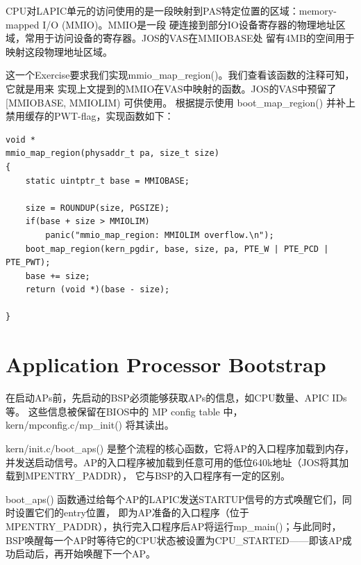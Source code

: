 \documentclass[12pt, letterpaper]{report}
\begin{document}
CPU对LAPIC单元的访问使用的是一段映射到PAS特定位置的区域：memory-mapped I/O (MMIO)。MMIO是一段
硬连接到部分IO设备寄存器的物理地址区域，常用于访问设备的寄存器。JOS的VAS在MMIOBASE处
留有4MB的空间用于映射这段物理地址区域。\par
\newpage
{}
\quad \par
这一个Exercise要求我们实现mmio\_map\_region()。我们查看该函数的注释可知，它就是用来
实现上文提到的MMIO在VAS中映射的函数。JOS的VAS中预留了 [MMIOBASE, MMIOLIM) 可供使用。
根据提示使用 boot\_map\_region() 并补上禁用缓存的PWT-flag，实现函数如下：\par 
\lstset{style=CStyle}
\setmainfont{Consolas}
\begin{lstlisting}
void *
mmio_map_region(physaddr_t pa, size_t size)
{
    static uintptr_t base = MMIOBASE;

    size = ROUNDUP(size, PGSIZE);
    if(base + size > MMIOLIM)
        panic("mmio_map_region: MMIOLIM overflow.\n");
    boot_map_region(kern_pgdir, base, size, pa, PTE_W | PTE_PCD | PTE_PWT);
    base += size;
    return (void *)(base - size);
    
}
\end{lstlisting}
\setmainfont{Times New Roman}

\section[\large Application Processor Bootstrap]{Application Processor Bootstrap}
在启动APs前，先启动的BSP必须能够获取APs的信息，如CPU数量、APIC IDs等。
这些信息被保留在BIOS中的 MP config table 中，kern/mpconfig.c/mp\_init() 
将其读出。\par 
kern/init.c/boot\_aps() 是整个流程的核心函数，它将AP的入口程序加载到内存，
并发送启动信号。AP的入口程序被加载到任意可用的低位640k地址（JOS将其加载到MPENTRY\_PADDR），
它与BSP的入口程序有一定的区别。 \par 
boot\_aps() 函数通过给每个AP的LAPIC发送STARTUP信号的方式唤醒它们，同时设置它们的entry位置，
即为AP准备的入口程序（位于MPENTRY\_PADDR），执行完入口程序后AP将运行mp\_main()；与此同时，
BSP唤醒每一个AP时等待它的CPU状态被设置为CPU\_STARTED——即该AP成功启动后，再开始唤醒下一个AP。\par 
\end{document}
